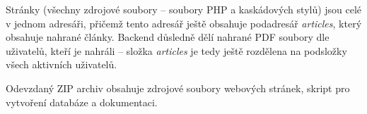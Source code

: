 Stránky (všechny zdrojové soubory -- soubory PHP a kaskádových stylů) jsou celé v jednom adresáři, přičemž tento adresář ještě obsahuje podadresář \emph{articles}, který obsahuje nahrané články. Backend důsledně dělí nahrané PDF soubory dle uživatelů, kteří je nahráli -- složka \emph{articles} je tedy ještě rozdělena na podsložky všech aktivních uživatelů.
\par
Odevzdaný ZIP archiv obsahuje zdrojové soubory webových stránek, skript pro vytvoření databáze a dokumentaci.